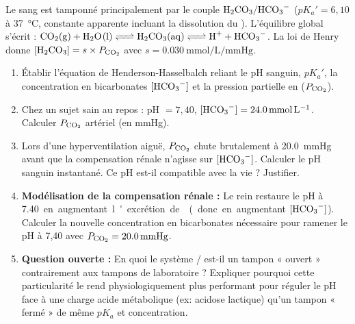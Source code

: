\documentclass[11pt]{article}
\begin{document}
\begin{exercice}
Le sang est tamponné principalement par le couple $\ce{H2CO3}/\ce{HCO3-}$ ($pK_a' = 6,10$ à \SI{37}{\celsius}, constante apparente incluant la dissolution du ). L'équilibre global s'écrit : $\ce{CO2(g) + H2O(l) <=> H2CO3(aq) <=> H+ + HCO3-}$. La loi de Henry donne $[\ce{H2CO3}] = s \times P_{\ce{CO2}}$ avec $s = \SI{0,030}{\mmol\per\liter\per\mmHg}$.
\begin{enumerate}
    \item Établir l'équation de Henderson-Hasselbalch reliant le pH sanguin, $pK_a'$, la concentration en bicarbonates $[\ce{HCO3-}]$ et la pression partielle en  ($P_{\ce{CO2}}$).
    \item Chez un sujet sain au repos : pH $= 7,40$, $[\ce{HCO3-}] = \SI{24,0}{\mmol\per\liter}$. Calculer $P_{\ce{CO2}}$ artériel (en \si{\mmHg}).
    \item Lors d'une hyperventilation aiguë, $P_{\ce{CO2}}$ chute brutalement à \SI{20,0}{\mmHg} avant que la compensation rénale n'agisse sur $[\ce{HCO3-}]$. Calculer le pH sanguin instantané. Ce pH est-il compatible avec la vie ? Justifier.
    \item \textbf{Modélisation de la compensation rénale :} Le rein restaure le pH à \SI{7,40} en augmentant l'excrétion de  (donc en augmentant $[\ce{HCO3-}]$). Calculer la nouvelle concentration en bicarbonates nécessaire pour ramener le pH à 7,40 avec $P_{\ce{CO2}} = \SI{20,0}{\mmHg}$.
    \item \textbf{Question ouverte :} En quoi le système / est-il un tampon « ouvert » contrairement aux tampons de laboratoire ? Expliquer pourquoi cette particularité le rend physiologiquement plus performant pour réguler le pH face à une charge acide métabolique (ex: acidose lactique) qu'un tampon « fermé » de même $pK_a$ et concentration.
\end{enumerate}
\end{exercice}
\end{document}
